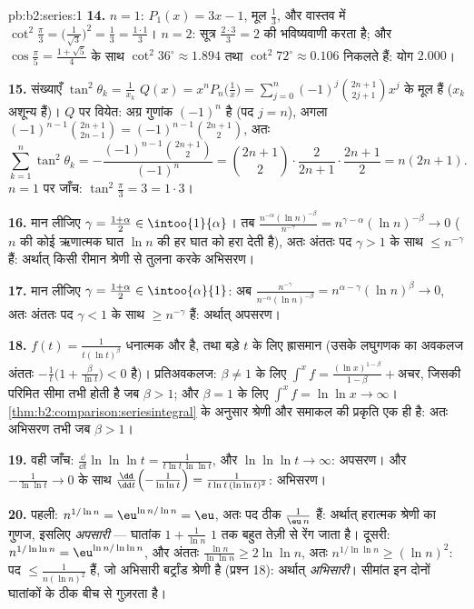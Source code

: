 \begin{solution}{pb:b2:series:1}
\textbf{14.} $n = 1$: $P_1(x) = 3x - 1$, मूल $\frac13$, और वास्तव में $\cot^2\frac\pi3 = \bigl(\frac1{\sqrt3}\bigr)^2 =
\frac13 = \frac{1\cdot1}3$। $n = 2$: सूत्र $\frac{2\cdot3}3 = 2$ की
भविष्यवाणी करता है; और $\cos\frac\pi5 = \frac{1 +
\sqrt5}{4}$ के साथ $\cot^2 36^\circ \approx 1.894$ तथा $\cot^2 72^\circ \approx 0.106$ निकलते हैं: योग $2.000$।

\textbf{15.} संख्याएँ $\tan^2\theta_k = \frac1{x_k}$ $Q(x) = x^nP_n\bigl(\frac1x\bigr) =
\sum_{j=0}^n(-1)^j\binom{2n+1}{2j+1}x^j$ के मूल हैं ($x_k$ अशून्य हैं)। $Q$ पर
वियेत: अग्र गुणांक $(-1)^n$ है (पद $j = n$), अगला $(-1)^{n-1}\binom{2n+1}{2n-1} =
(-1)^{n-1}\binom{2n+1}{2}$, अतः
\[
\sum_{k=1}^n\tan^2\theta_k =
-\frac{(-1)^{n-1}\binom{2n+1}2}{(-1)^n} = \binom{2n+1}2\cdot
\frac{2}{2n+1}\cdot\frac{2n+1}{2}
= n(2n+1).
\]
$n = 1$ पर जाँच: $\tan^2\frac\pi3 = 3 = 1\cdot3$।

\textbf{16.} मान लीजिए $\gamma = \frac{1+\alpha}2 \in
\intoo{1}{\alpha}$। तब $\frac{n^{-\alpha}(\ln
n)^{-\beta}}{n^{-\gamma}} = n^{\gamma - \alpha}(\ln n)^{-\beta}
\to 0$ ($n$ की कोई ऋणात्मक घात $\ln n$ की हर घात
को हरा देती है), अतः अंततः पद $\gamma > 1$ के साथ $\leq n^{-\gamma}$ हैं: अर्थात् किसी रीमान
श्रेणी से तुलना करके अभिसरण।

\textbf{17.} मान लीजिए $\gamma = \frac{1+\alpha}2 \in
\intoo{\alpha}{1}$: अब $\frac{n^{-\gamma}}{n^{-\alpha}(\ln
n)^{-\beta}} = n^{\alpha-\gamma}(\ln n)^{\beta} \to 0$, अतः अंततः पद $\gamma < 1$ के साथ $\geq n^{-\gamma}$ हैं:
अर्थात् अपसरण।

\textbf{18.} $f(t) = \frac1{t(\ln t)^\beta}$ धनात्मक और  है, तथा बड़े $t$ के लिए ह्रासमान (उसके
लघुगणक का अवकलज अंततः $-\frac1t\bigl(1 + \frac{\beta}{\ln t}\bigr) < 0$ है)। प्रतिअवकलज: $\beta \neq 1$ के लिए
$\int^x f = \frac{(\ln x)^{1-\beta}}{1-\beta} + \text{अचर}$, जिसकी परिमित सीमा तभी होती है जब $\beta > 1$; और $\beta = 1$ के लिए
$\int^x f = \ln\ln x \to \infty$। \cref{thm:b2:comparison:seriesintegral} के अनुसार श्रेणी और समाकल की प्रकृति एक ही है: अतः अभिसरण तभी
जब $\beta > 1$।

\textbf{19.} वही जाँच: $\frac{\dd}{\dd t}\ln\ln\ln t =
\frac{1}{t\ln t\,\ln\ln t}$, और $\ln\ln\ln t \to \infty$: अपसरण। और $-\frac1{\ln\ln t} \to
0$ के साथ $\frac{\dd}{\dd t}\Bigl(-\frac1{\ln\ln t}\Bigr)
= \frac{1}{t\ln t\,(\ln\ln t)^2}$: अभिसरण।

\textbf{20.} पहली: $n^{1/\ln n} = \eu^{\ln n/\ln n} = \eu$, अतः पद ठीक $\frac{1}{\eu\,n}$ हैं: अर्थात् हरात्मक श्रेणी का
गुणज, इसलिए \emph{अपसारी} --- घातांक $1 +
\frac1{\ln n}$ $1$ तक बहुत तेज़ी से रेंग जाता
है। दूसरी: $n^{1/\ln\ln n}
= \eu^{\ln n/\ln\ln n}$, और अंततः $\frac{\ln n}{\ln\ln n} \geq
2\ln\ln n$, अतः $n^{1/\ln\ln n} \geq (\ln n)^2$: पद $\leq \frac1{n(\ln n)^2}$ हैं, जो अभिसारी बर्ट्रांड
श्रेणी है (प्रश्न 18): अर्थात् \emph{अभिसारी}। सीमांत इन दोनों घातांकों
के ठीक बीच से गुज़रता है।


\end{solution}
